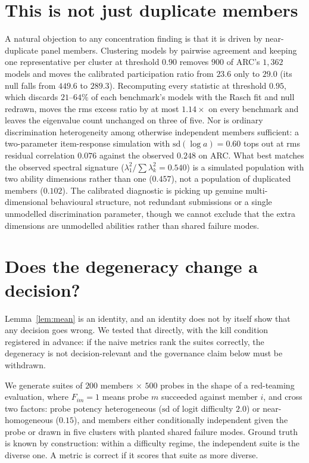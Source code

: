 \documentclass{article}
\begin{document}
\section{This is not just duplicate members}

A natural objection to any concentration finding is that it is driven by near-duplicate panel
members. Clustering models by pairwise agreement and keeping one representative per cluster at
threshold $0.90$ removes $900$ of ARC's $1{,}362$ models and moves the calibrated participation
ratio from $23.6$ only to $29.0$ (its null falls from $449.6$ to $289.3$). Recomputing every
statistic at threshold $0.95$, which discards $21$--$64\%$ of each benchmark's models with the
Rasch fit and null redrawn, moves the rms excess ratio by at most $1.14\times$ on every benchmark
and leaves the eigenvalue count unchanged on three of five. Nor is ordinary discrimination
heterogeneity among otherwise independent members sufficient: a two-parameter item-response
simulation with $\mathrm{sd}(\log a)=0.60$ tops out at rms residual correlation $0.076$ against
the observed $0.248$ on ARC. What best matches the observed spectral signature
($\lambda_1^2/\sum\lambda_k^2=0.540$) is a simulated population with two ability dimensions
rather than one ($0.457$), not a population of duplicated members ($0.102$). The calibrated
diagnostic is picking up genuine multi-dimensional behavioural structure, not redundant
submissions or a single unmodelled discrimination parameter, though we cannot exclude that the
extra dimensions are unmodelled abilities rather than shared failure modes.

\section{Does the degeneracy change a decision?}
\label{sec:decision}

Lemma~\ref{lem:mean} is an identity, and an identity does not by itself show that any decision goes
wrong. We tested that directly, with the kill condition registered in advance: if the naive metrics
rank the suites correctly, the degeneracy is not decision-relevant and the governance claim below
must be withdrawn.

We generate suites of $200$ members $\times$ $500$ probes in the shape of a red-teaming evaluation,
where $F_{im}=1$ means probe $m$ succeeded against member $i$, and cross two factors: probe potency
heterogeneous ($\mathrm{sd}$ of logit difficulty $2.0$) or near-homogeneous ($0.15$), and members
either conditionally independent given the probe or drawn in five clusters with planted shared
failure modes. Ground truth is known by construction: within a difficulty regime, the independent
suite is the diverse one. A metric is correct if it scores that suite as more diverse.
\end{document}
